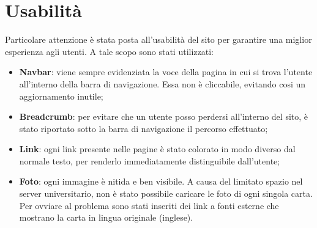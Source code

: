\section{Usabilità}
Particolare attenzione è stata posta all'usabilità del sito per garantire una miglior esperienza agli utenti. A tale scopo sono stati utilizzati:
\begin{itemize}
	\item \textbf{Navbar}: viene sempre evidenziata la voce della pagina in cui si trova l'utente all'interno della barra di navigazione. Essa non è cliccabile, evitando cosi un aggiornamento inutile;

	\item \textbf{Breadcrumb}: per evitare che un utente posso perdersi all'interno del sito, è stato riportato sotto la barra di navigazione il percorso effettuato;
	\item \textbf{Link}: ogni link presente nelle pagine è stato colorato in modo diverso dal normale testo, per renderlo immediatamente distinguibile dall'utente;
	\item \textbf{Foto}: ogni immagine è nitida e ben visibile. A causa del limitato spazio nel server universitario, non è stato possibile caricare le foto di ogni singola carta. Per ovviare al problema sono stati inseriti dei link a fonti esterne che mostrano la carta in lingua originale (inglese).
\end{itemize}


\newpage
